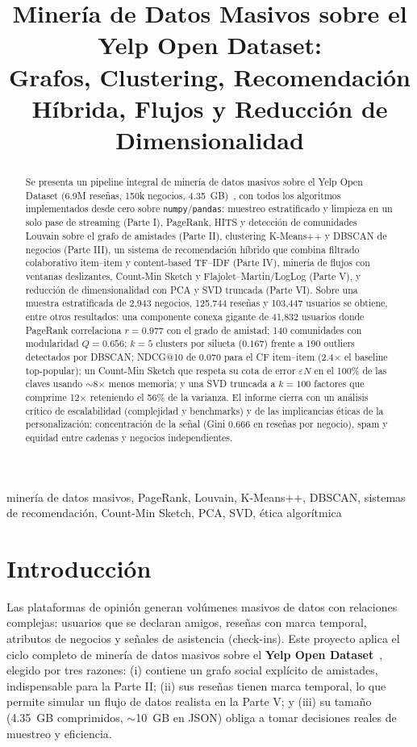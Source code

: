 \documentclass[conference]{IEEEtran}
\title{Minería de Datos Masivos sobre el Yelp Open Dataset:\\
Grafos, Clustering, Recomendación Híbrida, Flujos y Reducción de Dimensionalidad}
\author{\IEEEauthorblockN{Christian Frisancho \qquad Camila Rodríguez \qquad Marcelo Zuloeta}
\IEEEauthorblockA{\textit{Universidad de Ingeniería y Tecnología (UTEC)} --- Lima, Perú \\
\texttt{\{christian.frisancho, camila.rodriguez, marcelo.zuloeta\}@utec.edu.pe}}}
\begin{document}
\maketitle

\begin{abstract}
Se presenta un pipeline integral de minería de datos masivos sobre el Yelp Open Dataset (6.9M reseñas, 150k negocios, 4.35~GB)~\cite{yelp}, con todos los algoritmos implementados desde cero sobre \texttt{numpy}/\texttt{pandas}: muestreo estratificado y limpieza en un solo pase de streaming (Parte I), PageRank, HITS y detección de comunidades Louvain sobre el grafo de amistades (Parte II), clustering K-Means++ y DBSCAN de negocios (Parte III), un sistema de recomendación híbrido que combina filtrado colaborativo item--item y content-based TF--IDF (Parte IV), minería de flujos con ventanas deslizantes, Count-Min Sketch y Flajolet--Martin/LogLog (Parte V), y reducción de dimensionalidad con PCA y SVD truncada (Parte VI). Sobre una muestra estratificada de 2{,}943 negocios, 125{,}744 reseñas y 103{,}447 usuarios se obtiene, entre otros resultados: una componente conexa gigante de 41{,}832 usuarios donde PageRank correlaciona $r=0.977$ con el grado de amistad; 140 comunidades con modularidad $Q=0.656$; $k=5$ clusters por silueta ($0.167$) frente a 190 outliers detectados por DBSCAN; NDCG@10 de $0.070$ para el CF item--item (2.4$\times$ el baseline top-popular); un Count-Min Sketch que respeta su cota de error $\varepsilon N$ en el 100\% de las claves usando $\sim$8$\times$ menos memoria; y una SVD truncada a $k=100$ factores que comprime 12$\times$ reteniendo el 56\% de la varianza. El informe cierra con un análisis crítico de escalabilidad (complejidad y benchmarks) y de las implicancias éticas de la personalización: concentración de la señal (Gini $0.666$ en reseñas por negocio), spam y equidad entre cadenas y negocios independientes.
\end{abstract}

\begin{IEEEkeywords}
minería de datos masivos, PageRank, Louvain, K-Means++, DBSCAN, sistemas de recomendación, Count-Min Sketch, PCA, SVD, ética algorítmica
\end{IEEEkeywords}

\section{Introducción}
Las plataformas de opinión generan volúmenes masivos de datos con relaciones complejas: usuarios que se declaran amigos, reseñas con marca temporal, atributos de negocios y señales de asistencia (check-ins). Este proyecto aplica el ciclo completo de minería de datos masivos sobre el \textbf{Yelp Open Dataset}~\cite{yelp}, elegido por tres razones: (i) contiene un grafo social explícito de amistades, indispensable para la Parte II; (ii) sus reseñas tienen marca temporal, lo que permite simular un flujo de datos realista en la Parte V; y (iii) su tamaño (4.35~GB comprimidos, $\sim$10~GB en JSON) obliga a tomar decisiones reales de muestreo y eficiencia.
\end{document}
